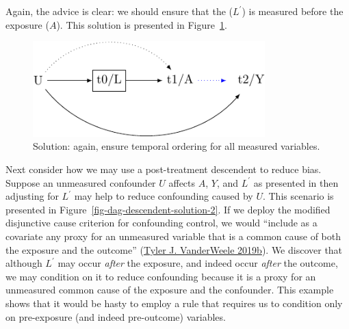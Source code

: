 \documentclass[
  singlecolumn]{report}
\begin{document}
Again, the advice is clear: we should ensure that the (\(L^\prime\)) is
measured before the exposure (\(A\)). This solution is presented in
Figure~\ref{fig-dag-descendent-solution}.

\begin{figure}

{\centering \includegraphics[width=0.8\textwidth,height=\textheight]{causal-dags_files/figure-pdf/fig-dag-descendent-solution-1.pdf}

}

\caption{\label{fig-dag-descendent-solution}Solution: again, ensure
temporal ordering for all measured variables.}

\end{figure}

Next consider how we may use a post-treatment descendent to reduce bias.
Suppose an unmeasured confounder \(U\) affects \(A\), \(Y\), and
\(L^\prime\) as presented in then adjusting for \(L^\prime\) may help to
reduce confounding caused by \(U\). This scenario is presented in
Figure~\ref{fig-dag-descendent-solution-2}. If we deploy the modified
disjunctive cause criterion for confounding control, we would ``include
as a covariate any proxy for an unmeasured variable that is a common
cause of both the exposure and the outcome''
(\protect\hyperlink{ref-vanderweele2019a}{Tyler J. VanderWeele 2019b}).
We discover that although \(L^\prime\) may occur \emph{after} the
exposure, and indeed occur \emph{after} the outcome, we may condition on
it to reduce confounding because it is a proxy for an unmeasured common
cause of the exposure and the confounder. This example shows that it
would be hasty to employ a rule that requires us to condition only on
pre-exposure (and indeed pre-outcome) variables.
\end{document}
